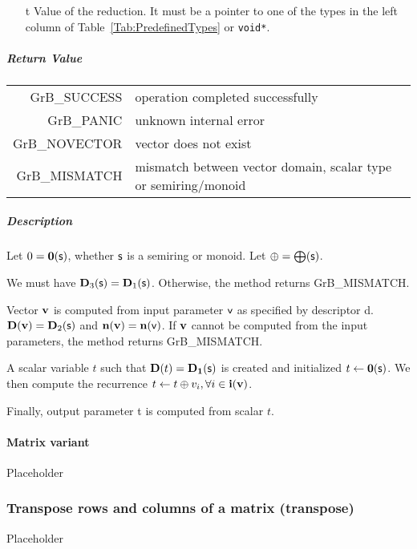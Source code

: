 \begin{itemize}
	\item[{\sf t}] Value of the reduction. It must
	be a pointer to one of the types in 
	the left column of Table~\ref{Tab:PredefinedTypes} or
	{\tt void*}.
\end{itemize}

\subparagraph{Return Value}

\begin{tabular}{rl}
{\sf GrB\_SUCCESS}	& operation completed successfully \\
{\sf GrB\_PANIC}	& unknown internal error \\
{\sf GrB\_NOVECTOR}	& vector does not exist \\
{\sf GrB\_MISMATCH}	& mismatch between vector domain, scalar type or semiring/monoid \\
\end{tabular}

\subparagraph{Description}

Let $0 = \bold{0}({\sf s})$, whether ${\sf s}$ is a semiring or monoid.
Let $\oplus = \bigoplus({\sf s})$.

We must have $\bold{D}_3({\sf s}) = \bold{D}_1({\sf s})$.
Otherwise, the method returns {\sf GrB\_MISMATCH}.

Vector ${\bf v}$ is computed from input parameter ${\sf v}$ as
specified by descriptor {\sf d}. $\bold{D}({\bf v}) = \bold{D}_2({\sf s})$
and $\bold{n}({\bf v}) = \bold{n}({\sf v})$. If ${\bf v}$ cannot be computed
from the input parameters, the method returns {\sf GrB\_MISMATCH}.

A scalar variable $t$ such that $\bold{D}(t) = \bold{D_1}({\sf s})$ is
created and initialized $t \leftarrow \bold{0}({\sf s})$. 
We then compute the recurrence $t \leftarrow t \oplus v_i, \forall i \in {\bf i}({\bf v})$.

Finally, output parameter {\sf t} is computed from scalar $t$.



\paragraph{Matrix variant}

Placeholder



\subsubsection{Transpose rows and columns of a matrix ({\sf transpose})}

Placeholder

